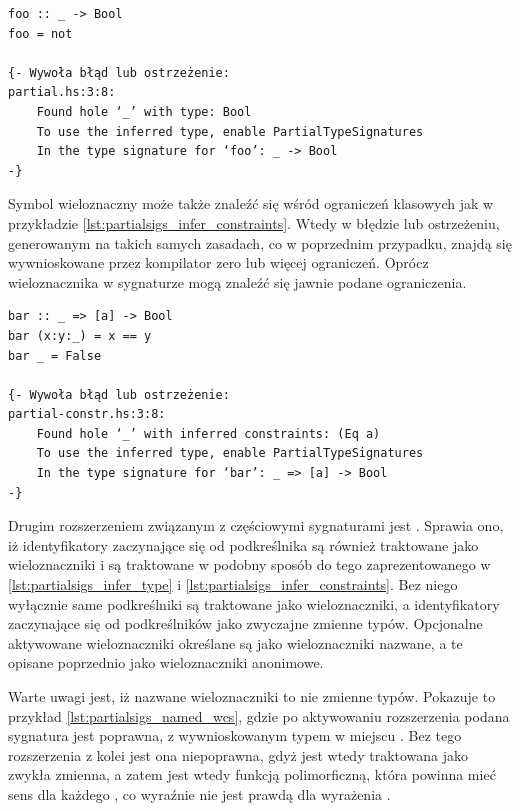 {\begin{lstlisting}[float,label={lst:partialsigs_infer_type},
                   caption={Przykład użycia anonimowego symbolu wieloznacznego w sygnaturze typu.}]
foo :: _ -> Bool
foo = not

{- Wywoła błąd lub ostrzeżenie:
partial.hs:3:8:
    Found hole ‘_’ with type: Bool
    To use the inferred type, enable PartialTypeSignatures
    In the type signature for ‘foo’: _ -> Bool
-}
\end{lstlisting}

Symbol wieloznaczny może także znaleźć się wśród ograniczeń klasowych jak w
przykładzie \ref{lst:partialsigs_infer_constraints}. Wtedy w błędzie lub
ostrzeżeniu, generowanym na takich samych zasadach, co w poprzednim przypadku,
znajdą się wywnioskowane przez kompilator zero lub więcej ograniczeń. Oprócz
wieloznacznika w sygnaturze mogą znaleźć się jawnie podane ograniczenia.

\begin{lstlisting}[float,label={lst:partialsigs_infer_constraints},
                   caption={Przykład użycia anonimowego symbolu wieloznacznego w ograniczeniach typu.}]
bar :: _ => [a] -> Bool
bar (x:y:_) = x == y
bar _ = False

{- Wywoła błąd lub ostrzeżenie:
partial-constr.hs:3:8:
    Found hole ‘_’ with inferred constraints: (Eq a)
    To use the inferred type, enable PartialTypeSignatures
    In the type signature for ‘bar’: _ => [a] -> Bool
-}
\end{lstlisting}

Drugim rozszerzeniem związanym z częściowymi sygnaturami jest
. Sprawia ono, iż identyfikatory zaczynające się od
podkreślnika są również traktowane jako wieloznaczniki i są traktowane w podobny
sposób do tego zaprezentowanego w \ref{lst:partialsigs_infer_type} i
\ref{lst:partialsigs_infer_constraints}. Bez niego wyłącznie same podkreślniki
są traktowane jako wieloznaczniki, a identyfikatory zaczynające się od
podkreślników jako zwyczajne zmienne typów. Opcjonalne aktywowane wieloznaczniki
określane są jako wieloznaczniki nazwane, a te opisane poprzednio jako
wieloznaczniki anonimowe.

Warte uwagi jest, iż nazwane wieloznaczniki to nie zmienne typów. Pokazuje to
przykład \ref{lst:partialsigs_named_wcs}, gdzie po aktywowaniu rozszerzenia
 podana sygnatura jest poprawna, z wywnioskowanym typem
 w miejscu . Bez tego rozszerzenia z kolei jest
ona niepoprawna, gdyż  jest wtedy traktowana jako zwykła
zmienna, a zatem  jest wtedy funkcją polimorficzną, która powinna mieć
sens dla każdego , co wyraźnie nie jest prawdą dla wyrażenia
\cite{GuidePartialTypeSignatures}.

}
